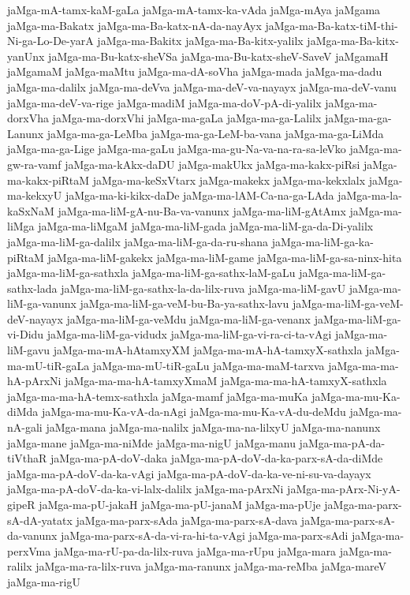 {jaMga-mA-tamx-kaM-gaLa
jaMga-mA-tamx-ka-vAda
jaMga-mAya
jaMgama
jaMga-ma-Bakatx
jaMga-ma-Ba-katx-nA-da-nayAyx
jaMga-ma-Ba-katx-tiM-thi-Ni-ga-Lo-De-yarA
jaMga-ma-Bakitx
jaMga-ma-Ba-kitx-yalilx
jaMga-ma-Ba-kitx-yanUnx
jaMga-ma-Bu-katx-sheVSa
jaMga-ma-Bu-katx-sheV-SaveV
jaMgamaH
jaMgamaM
jaMga-maMtu
jaMga-ma-dA-soVha
jaMga-mada
jaMga-ma-dadu
jaMga-ma-dalilx
jaMga-ma-deVva
jaMga-ma-deV-va-nayayx
jaMga-ma-deV-vanu
jaMga-ma-deV-va-rige
jaMga-madiM
jaMga-ma-doV-pA-di-yalilx
jaMga-ma-dorxVha
jaMga-ma-dorxVhi
jaMga-ma-gaLa
jaMga-ma-ga-Lalilx
jaMga-ma-ga-Lanunx
jaMga-ma-ga-LeMba
jaMga-ma-ga-LeM-ba-vana
jaMga-ma-ga-LiMda
jaMga-ma-ga-Lige
jaMga-ma-gaLu
jaMga-ma-gu-Na-va-na-ra-sa-leVko
jaMga-ma-gw-ra-vamf
jaMga-ma-kAkx-daDU
jaMga-makUkx
jaMga-ma-kakx-piRsi
jaMga-ma-kakx-piRtaM
jaMga-ma-keSxVtarx
jaMga-makekx
jaMga-ma-kekxlalx
jaMga-ma-kekxyU
jaMga-ma-ki-kikx-daDe
jaMga-ma-lAM-Ca-na-ga-LAda
jaMga-ma-la-kaSxNaM
jaMga-ma-liM-gA-nu-Ba-va-vanunx
jaMga-ma-liM-gAtAmx
jaMga-ma-liMga
jaMga-ma-liMgaM
jaMga-ma-liM-gada
jaMga-ma-liM-ga-da-Di-yalilx
jaMga-ma-liM-ga-dalilx
jaMga-ma-liM-ga-da-ru-shana
jaMga-ma-liM-ga-ka-piRtaM
jaMga-ma-liM-gakekx
jaMga-ma-liM-game
jaMga-ma-liM-ga-sa-ninx-hita
jaMga-ma-liM-ga-sathxla
jaMga-ma-liM-ga-sathx-laM-gaLu
jaMga-ma-liM-ga-sathx-lada
jaMga-ma-liM-ga-sathx-la-da-lilx-ruva
jaMga-ma-liM-gavU
jaMga-ma-liM-ga-vanunx
jaMga-ma-liM-ga-veM-bu-Ba-ya-sathx-lavu
jaMga-ma-liM-ga-veM-deV-nayayx
jaMga-ma-liM-ga-veMdu
jaMga-ma-liM-ga-venanx
jaMga-ma-liM-ga-vi-Didu
jaMga-ma-liM-ga-vidudx
jaMga-ma-liM-ga-vi-ra-ci-ta-vAgi
jaMga-ma-liM-gavu
jaMga-ma-mA-hAtamxyXM
jaMga-ma-mA-hA-tamxyX-sathxla
jaMga-ma-mU-tiR-gaLa
jaMga-ma-mU-tiR-gaLu
jaMga-ma-maM-tarxva
jaMga-ma-ma-hA-pArxNi
jaMga-ma-ma-hA-tamxyXmaM
jaMga-ma-ma-hA-tamxyX-sathxla
jaMga-ma-ma-hA-temx-sathxla
jaMga-mamf
jaMga-ma-muKa
jaMga-ma-mu-Ka-diMda
jaMga-ma-mu-Ka-vA-da-nAgi
jaMga-ma-mu-Ka-vA-du-deMdu
jaMga-ma-nA-gali
jaMga-mana
jaMga-ma-nalilx
jaMga-ma-na-lilxyU
jaMga-ma-nanunx
jaMga-mane
jaMga-ma-niMde
jaMga-ma-nigU
jaMga-manu
jaMga-ma-pA-da-tiVthaR
jaMga-ma-pA-doV-daka
jaMga-ma-pA-doV-da-ka-parx-sA-da-diMde
jaMga-ma-pA-doV-da-ka-vAgi
jaMga-ma-pA-doV-da-ka-ve-ni-su-va-dayayx
jaMga-ma-pA-doV-da-ka-vi-lalx-dalilx
jaMga-ma-pArxNi
jaMga-ma-pArx-Ni-yA-gipeR
jaMga-ma-pU-jakaH
jaMga-ma-pU-janaM
jaMga-ma-pUje
jaMga-ma-parx-sA-dA-yatatx
jaMga-ma-parx-sAda
jaMga-ma-parx-sA-dava
jaMga-ma-parx-sA-da-vanunx
jaMga-ma-parx-sA-da-vi-ra-hi-ta-vAgi
jaMga-ma-parx-sAdi
jaMga-ma-perxVma
jaMga-ma-rU-pa-da-lilx-ruva
jaMga-ma-rUpu
jaMga-mara
jaMga-ma-ralilx
jaMga-ma-ra-lilx-ruva
jaMga-ma-ranunx
jaMga-ma-reMba
jaMga-mareV
jaMga-ma-rigU
}
